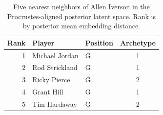 \begin{table}[htbp]
  \centering\small
  \begin{tabular}{rllc}
    \toprule
    Rank & Player & Position & Archetype \\
    \midrule
    1 & Michael Jordan & G & 1 \\
    2 & Rod Strickland & G & 1 \\
    3 & Ricky Pierce & G & 2 \\
    4 & Grant Hill & G & 1 \\
    5 & Tim Hardaway & G & 2 \\
    \bottomrule
  \end{tabular}
  \caption{Five nearest neighbors of Allen Iverson in the Procrustes-aligned posterior latent space. Rank is by posterior mean embedding distance.}
  \label{tab:Allen_Iverson_neighbors}
\end{table}

